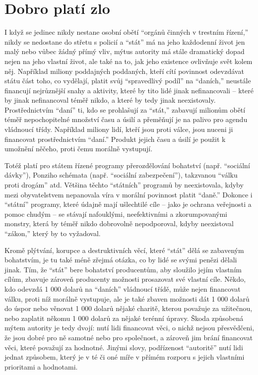 \documentclass{book}
\begin{document}
\section{Dobro platí zlo}

I když se jedinec nikdy nestane osobní obětí \enquote{orgánů činných v trestním řízení,} nikdy se nedostane do střetu s policií a \enquote{stát} má na jeho každodenní život jen malý nebo vůbec žádný přímý vliv, mýtus autority má stále dramatický dopad nejen na jeho vlastní život, ale také na to, jak jeho existence ovlivňuje svět kolem něj. Například miliony poddajných poddaných, kteří cítí povinnost odevzdávat státu část toho, co vydělají, platit svůj \enquote{spravedlivý podíl} na \enquote{daních,} neustále financují nejrůznější snahy a aktivity, které by tito lidé jinak nefinancovali -- které by jinak nefinancoval téměř nikdo, a které by tedy jinak neexistovaly. Prostřednictvím \enquote{daní} ti, kdo se prohlašují za \enquote{stát,} zabavují milionům obětí téměř nepochopitelné množství času a úsilí a přeměňují je na palivo pro agendu vládnoucí třídy. Například miliony lidí, kteří jsou proti válce, jsou nuceni ji financovat prostřednictvím \enquote{daní.} Produkt jejich času a úsilí je použit k umožnění něčeho, proti čemu morálně vystupují.

Totéž platí pro státem řízené programy přerozdělování bohatství (např. \enquote{sociální dávky}), Ponziho schémata (např. \enquote{sociální zabezpečení}), takzvanou \enquote{válku proti drogám} atd. Většina těchto \enquote{státních} programů by neexistovala, kdyby mezi obyvatelstvem nepanovala víra v morální povinnost platit \enquote{daně.} Dokonce i \enquote{státní} programy, které údajně mají ušlechtilé cíle -- jako je ochrana veřejnosti a pomoc chudým -- se stávají nafouklými, neefektivními a zkorumpovanými monstry, která by téměř nikdo dobrovolně nepodporoval, kdyby neexistoval \enquote{zákon,} který by to vyžadoval.

Kromě plýtvání, korupce a destruktivních věcí, které \enquote{stát} dělá se zabaveným bohatstvím, je tu také méně zřejmá otázka, co by lidé se svými penězi dělali jinak. Tím, že \enquote{stát} bere bohatství producentům, aby sloužilo jejím vlastním cílům, zbavuje zároveň producenty možnosti prosazovat své vlastní cíle. Někdo, kdo odevzdá 1 000 dolarů na \enquote{daních} vládnoucí třídě, může nejen financovat válku, proti níž morálně vystupuje, ale je také zbaven možnosti dát 1 000 dolarů do úspor nebo věnovat 1 000 dolarů nějaké charitě, kterou považuje za užitečnou, nebo zaplatit někomu 1 000 dolarů za nějaké terénní úpravy. Škoda způsobená mýtem autority je tedy dvojí: nutí lidi financovat věci, o nichž nejsou přesvědčeni, že jsou dobré pro ně samotné nebo pro společnost, a zároveň jim brání financovat věci, které považují za hodnotné. Jinými slovy, podřízenost \enquote{autoritě} nutí lidi jednat způsobem, který je v té či oné míře v přímém rozporu s jejich vlastními prioritami a hodnotami.
\end{document}
